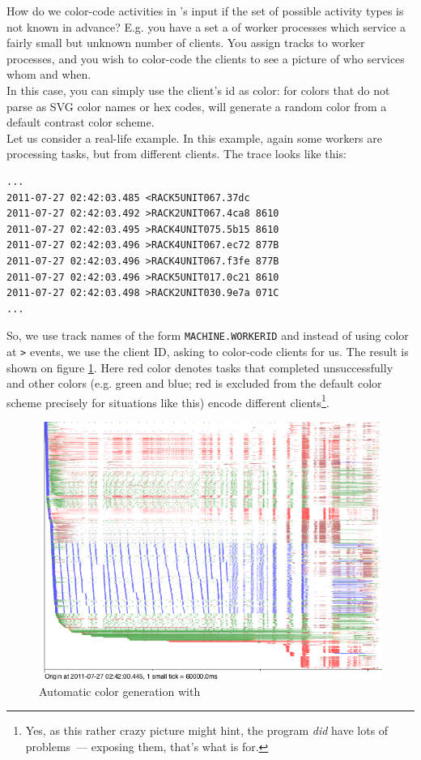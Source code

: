 \documentclass{article}
\begin{document}
How do we color-code activities in \splot{}'s input if the set of possible activity types is not known in advance? E.g. you have a set a of worker processes which service a fairly small but unknown number of clients. You assign tracks to worker processes, and you wish to color-code the clients to see a picture of who services whom and when.
\\
In this case, you can simply use the client's id as color: for colors that do not parse as SVG color names or hex codes, \splot{} will generate a random color from a default contrast color scheme.
\\
Let us consider a real-life example. In this example, again some workers are processing tasks, but from different clients.
The trace looks like this:
\begin{verbatim}
...
2011-07-27 02:42:03.485 <RACK5UNIT067.37dc
2011-07-27 02:42:03.492 >RACK2UNIT067.4ca8 8610
2011-07-27 02:42:03.495 >RACK4UNIT075.5b15 8610
2011-07-27 02:42:03.496 >RACK4UNIT067.ec72 877B
2011-07-27 02:42:03.496 >RACK4UNIT067.f3fe 877B
2011-07-27 02:42:03.496 >RACK5UNIT017.0c21 8610
2011-07-27 02:42:03.498 >RACK2UNIT030.9e7a 071C
...
\end{verbatim}
So, we use track names of the form \verb|MACHINE.WORKERID| and instead of using color at \texttt{>} events, we use the client ID, asking \splot{} to color-code clients for us. The result is shown on figure \ref{fig:splot-color-gen}. Here red color denotes tasks that completed unsuccessfully and other colors (e.g. green and blue; red is excluded from the default color scheme precisely for situations like this) encode different clients\footnote{Yes, as this rather crazy picture might hint, the program \emph{did} have lots of problems~--- exposing them, that's what \splot{} is for.}.

\begin{figure}[h]
\center
\includegraphics[width=\textwidth]{pics/splot/splot-color-gen.png}
\caption{Automatic color generation with \splot{}}
\label{fig:splot-color-gen}
\end{figure}
\end{document}

